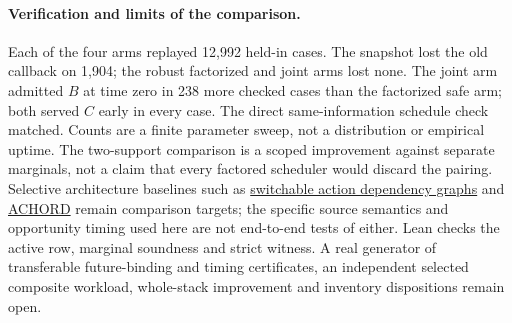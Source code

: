 \documentclass{article}
\begin{document}
\paragraph{Verification and limits of the comparison.}
Each of the four arms replayed 12,992 held-in cases. The snapshot
lost the old callback on 1,904; the robust factorized and joint
arms lost none. The joint arm admitted \(B\) at time zero in 238
more checked cases than the factorized safe arm; both served
\(C\) early in every case. The direct same-information schedule
check matched. Counts are a finite parameter sweep, not a
distribution or empirical uptime. The two-support comparison
is a scoped improvement against separate marginals, not a
claim that every factored scheduler would discard the pairing.
Selective architecture baselines such as
\href{https://arxiv.org/abs/2312.04190}{switchable action dependency graphs}
and \href{https://lillyclark.github.io/files/ACHORD_RA_L_IROS_.pdf}{ACHORD}
remain comparison targets; the specific source semantics and
opportunity timing used here are not end-to-end tests of either.
Lean checks the active row, marginal soundness and strict
witness. A real generator of transferable future-binding and
timing certificates, an independent selected composite workload,
whole-stack improvement and inventory dispositions remain open.
\end{document}
